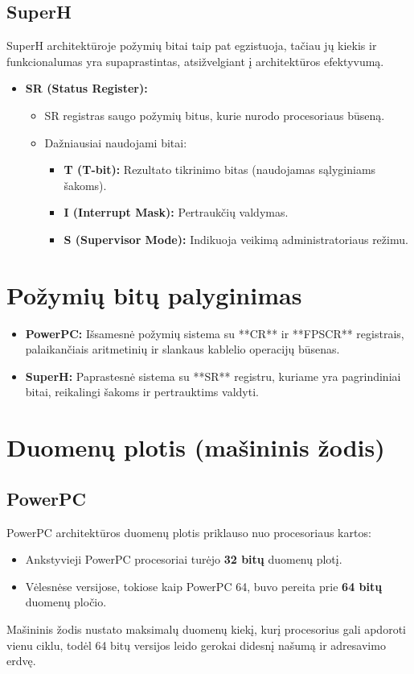 \documentclass{article}
\begin{document}
\subsection{SuperH}
SuperH architektūroje požymių bitai taip pat egzistuoja, tačiau jų kiekis ir funkcionalumas yra supaprastintas, atsižvelgiant į architektūros efektyvumą.

\begin{itemize}
    \item \textbf{SR (Status Register):}
        \begin{itemize}
            \item SR registras saugo požymių bitus, kurie nurodo procesoriaus būseną.
            \item Dažniausiai naudojami bitai:
                \begin{itemize}
                    \item \textbf{T (T-bit):} Rezultato tikrinimo bitas (naudojamas sąlyginiams šakoms).
                    \item \textbf{I (Interrupt Mask):} Pertraukčių valdymas.
                    \item \textbf{S (Supervisor Mode):} Indikuoja veikimą administratoriaus režimu.
                \end{itemize}
        \end{itemize}
\end{itemize}

\section*{Požymių bitų palyginimas}
\begin{itemize}
    \item \textbf{PowerPC:} Išsamesnė požymių sistema su **CR** ir **FPSCR** registrais, palaikančiais aritmetinių ir slankaus kablelio operacijų būsenas.
    \item \textbf{SuperH:} Paprastesnė sistema su **SR** registru, kuriame yra pagrindiniai bitai, reikalingi šakoms ir pertrauktims valdyti.
\end{itemize}

\section{Duomenų plotis (mašininis žodis)}
\subsection{PowerPC}
PowerPC architektūros duomenų plotis priklauso nuo procesoriaus kartos:
\begin{itemize}
    \item Ankstyvieji PowerPC procesoriai turėjo \textbf{32 bitų} duomenų plotį.
    \item Vėlesnėse versijose, tokiose kaip PowerPC 64, buvo pereita prie \textbf{64 bitų} duomenų pločio.
\end{itemize}
Mašininis žodis nustato maksimalų duomenų kiekį, kurį procesorius gali apdoroti vienu ciklu, todėl 64 bitų versijos leido gerokai didesnį našumą ir adresavimo erdvę.
\end{document}
